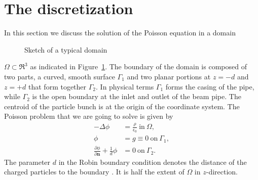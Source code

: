\section{The discretization}
\label{sec:discr}

In this section we discuss the solution of the Poisson equation in a
domain 
\begin{figure}[htb]
  \centering
  
  \caption{Sketch of a typical domain}
  \label{fig:domain}
\end{figure}
$\Omega \subset \Re^3$ as indicated in Figure~\ref{fig:domain}.  The
boundary of the domain is composed of two parts, a curved, smooth
surface $\Gamma_1$ and two planar portions at $z=-d$ and $z=+d$ that
form together $\Gamma_2$.  In physical terms $\Gamma_1$ forms the casing
of the pipe, while $\Gamma_2$ is the open boundary at the inlet and
outlet of the beam pipe.  The centroid of the particle bunch is at the
origin of the coordinate system.  The Poisson problem that we are going
to solve is given by
\begin{equation} \label{eq:poisson}
  \begin{aligned}
    -\Delta \phi &= \frac{\rho}{\epsilon_0}\ \text{in}\ \Omega, \\
    \phi &= g \equiv 0\ \text{on}\ \Gamma_1,   \\
    \frac{\partial \phi}{\partial \mathbf{n}} + \frac {1}{d} \phi &= 0\
    \text{on}\ \Gamma_2.
  \end{aligned}
\end{equation}
The parameter $d$ in the Robin boundary condition denotes the distance
of the charged particles to the boundary \cite{poplau_self-adaptive_2008}.  It is half the extent of
$\Omega$ in $z$-direction. 

